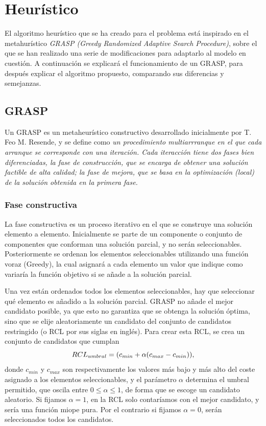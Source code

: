 \chapter{Heurístico}
\label{heurístico}
El algoritmo heurístico que se ha creado para el problema está inspirado en el metahurístico \textit{GRASP (Greedy Randomized Adaptive Search Procedure)}, sobre el que se han realizado una serie de modificaciones para adaptarlo al modelo en cuestión. A continuación se explicará el funcionamiento de un GRASP, para después explicar el algoritmo propuesto, comparando sus diferencias y semejanzas.

\section{GRASP}
Un GRASP es un metaheurístico constructivo desarrollado inicialmente por T. Feo   M. Resende, y se define como \cite{metaheurísticas} \textit{un procedimiento multiarrranque en el que cada arranque se corresponde con una iteración. Cada iteracción tiene dos fases bien diferenciadas, la fase de construcción, que se encarga de obtener una solución factible de alta calidad; la fase de mejora, que se basa en la optimización (local) de la solución obtenida en la primera fase.}

\subsection{Fase constructiva}
La fase constructiva es un proceso iterativo en el que se construye una solución elemento a elemento. Inicialmente se parte de un componente o conjunto de componentes que conforman una solución parcial, y no serán seleccionables. Posteriormente se ordenan los elementos seleccionables utilizando una función voraz (Greedy), la cual asignará a cada elemento un valor que indique como variaría la función objetivo si se añade a la solución parcial.

Una vez están ordenados todos los elementos seleccionables, hay que seleccionar qué elemento es añadido a la solución parcial. GRASP no añade el mejor candidato posible, ya que esto no garantiza que se obtenga la solución óptima, sino que se elije aleatoriamente un candidato del conjunto de candidatos restringido (o RCL por sus siglas en inglés). Para crear esta RCL, se crea un conjunto de candidatos que cumplan
\begin{equation}\\
{RCL}_{umbral} = (c_{min}+\alpha(c_{max} - c_{min} )),
\end{equation}
donde $c_{min}$ y $c_{max}$ son respectivamente los valores más bajo y más alto del coste asignado a los elementos seleccionables, y el parámetro $\alpha$ determina el umbral permitido, que oscila entre $0\leq \alpha \leq1$, de forma que se escoge un candidato aleatorio. Si fijamos $\alpha=1$, en la RCL solo contaríamos con el mejor candidato, y sería una función miope pura. Por el contrario si fijamos $\alpha=0$, serán seleccionados todos los candidatos.

